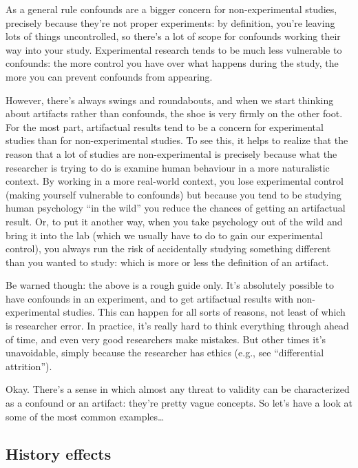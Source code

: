 \documentclass[
]{book}
\begin{document}
As a general rule confounds are a bigger concern for non-experimental studies, precisely because they're not proper experiments: by definition, you're leaving lots of things uncontrolled, so there's a lot of scope for confounds working their way into your study. Experimental research tends to be much less vulnerable to confounds: the more control you have over what happens during the study, the more you can prevent confounds from appearing.

However, there's always swings and roundabouts, and when we start thinking about artifacts rather than confounds, the shoe is very firmly on the other foot. For the most part, artifactual results tend to be a concern for experimental studies than for non-experimental studies. To see this, it helps to realize that the reason that a lot of studies are non-experimental is precisely because what the researcher is trying to do is examine human behaviour in a more naturalistic context. By working in a more real-world context, you lose experimental control (making yourself vulnerable to confounds) but because you tend to be studying human psychology ``in the wild'' you reduce the chances of getting an artifactual result. Or, to put it another way, when you take psychology out of the wild and bring it into the lab (which we usually have to do to gain our experimental control), you always run the risk of accidentally studying something different than you wanted to study: which is more or less the definition of an artifact.

Be warned though: the above is a rough guide only. It's absolutely possible to have confounds in an experiment, and to get artifactual results with non-experimental studies. This can happen for all sorts of reasons, not least of which is researcher error. In practice, it's really hard to think everything through ahead of time, and even very good researchers make mistakes. But other times it's unavoidable, simply because the researcher has ethics (e.g., see ``differential attrition'').

Okay. There's a sense in which almost any threat to validity can be characterized as a confound or an artifact: they're pretty vague concepts. So let's have a look at some of the most common examples\ldots{}

\hypertarget{history-effects}{%
\subsection{History effects}\label{history-effects}}
\end{document}
